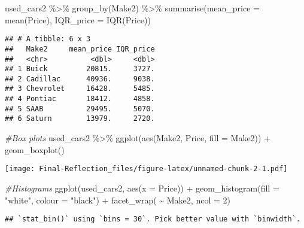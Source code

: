 \documentclass[
]{article}
\newenvironment{Shaded}{\begin{snugshade}}{\end{snugshade}}
\newcommand{\AttributeTok}[1]{\textcolor[rgb]{0.77,0.63,0.00}{#1}}
\newcommand{\CommentTok}[1]{\textcolor[rgb]{0.56,0.35,0.01}{\textit{#1}}}
\newcommand{\DecValTok}[1]{\textcolor[rgb]{0.00,0.00,0.81}{#1}}
\newcommand{\FunctionTok}[1]{\textcolor[rgb]{0.00,0.00,0.00}{#1}}
\newcommand{\NormalTok}[1]{#1}
\newcommand{\SpecialCharTok}[1]{\textcolor[rgb]{0.00,0.00,0.00}{#1}}
\newcommand{\StringTok}[1]{\textcolor[rgb]{0.31,0.60,0.02}{#1}}
\begin{document}
\begin{Shaded}
\begin{Highlighting}[]
\NormalTok{used\_cars2 }\SpecialCharTok{\%\textgreater{}\%}
  \FunctionTok{group\_by}\NormalTok{(Make2) }\SpecialCharTok{\%\textgreater{}\%}
  \FunctionTok{summarise}\NormalTok{(}\AttributeTok{mean\_price =} \FunctionTok{mean}\NormalTok{(Price),}
            \AttributeTok{IQR\_price =} \FunctionTok{IQR}\NormalTok{(Price))}
\end{Highlighting}
\end{Shaded}

\begin{verbatim}
## # A tibble: 6 x 3
##   Make2     mean_price IQR_price
##   <chr>          <dbl>     <dbl>
## 1 Buick         20815.     3727.
## 2 Cadillac      40936.     9038.
## 3 Chevrolet     16428.     5485.
## 4 Pontiac       18412.     4858.
## 5 SAAB          29495.     5070.
## 6 Saturn        13979.     2720.
\end{verbatim}

\begin{Shaded}
\begin{Highlighting}[]
\CommentTok{\#Box plots}
\NormalTok{used\_cars2 }\SpecialCharTok{\%\textgreater{}\%}
  \FunctionTok{ggplot}\NormalTok{(}\FunctionTok{aes}\NormalTok{(Make2, Price, }\AttributeTok{fill =}\NormalTok{ Make2)) }\SpecialCharTok{+}
    \FunctionTok{geom\_boxplot}\NormalTok{()}
\end{Highlighting}
\end{Shaded}

\texttt{[image: Final-Reflection\_files/figure-latex/unnamed-chunk-2-1.pdf]}

\begin{Shaded}
\begin{Highlighting}[]
\CommentTok{\#Histograms}
\FunctionTok{ggplot}\NormalTok{(used\_cars2, }\FunctionTok{aes}\NormalTok{(}\AttributeTok{x =}\NormalTok{ Price)) }\SpecialCharTok{+}
  \FunctionTok{geom\_histogram}\NormalTok{(}\AttributeTok{fill =} \StringTok{"white"}\NormalTok{, }\AttributeTok{colour =} \StringTok{"black"}\NormalTok{) }\SpecialCharTok{+}
  \FunctionTok{facet\_wrap}\NormalTok{( }\SpecialCharTok{\textasciitilde{}}\NormalTok{ Make2, }\AttributeTok{ncol =} \DecValTok{2}\NormalTok{)}
\end{Highlighting}
\end{Shaded}

\begin{verbatim}
## `stat_bin()` using `bins = 30`. Pick better value with `binwidth`.
\end{verbatim}
\end{document}
